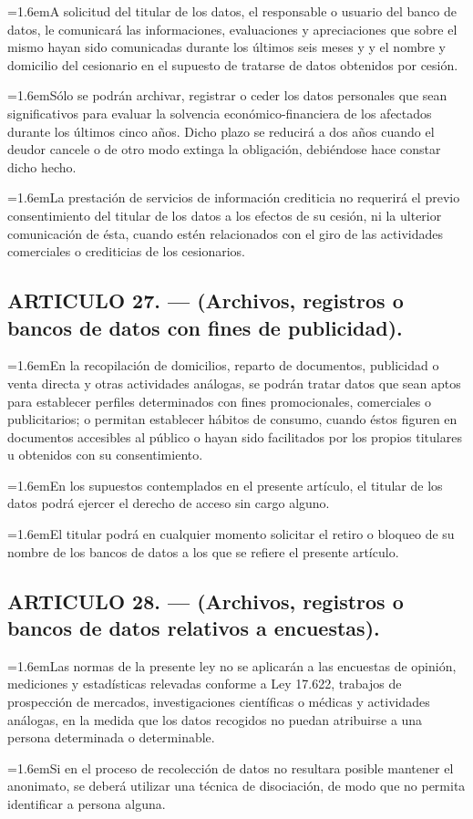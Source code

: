 \documentclass[10pt,a4paper]{article}
\newcommand{\articulo}[1]{\subsection{#1}}
\newcommand{\inciso}[2]{\par{\hangindent=1.6em\hangafter=1\makebox[1.6em][l]{#1}#2\par}}
\begin{document}
\inciso{3.}{A solicitud del titular de los datos, el responsable o usuario del banco de datos, le comunicará las informaciones, evaluaciones y apreciaciones que sobre el mismo hayan sido comunicadas durante los últimos seis meses y y el nombre y domicilio del cesionario en el supuesto de tratarse de datos obtenidos por cesión.}

\inciso{4.}{Sólo se podrán archivar, registrar o ceder los datos personales que sean significativos para evaluar la solvencia económico-financiera de los afectados durante los últimos cinco años. Dicho plazo se reducirá a dos años cuando el deudor cancele o de otro modo extinga la obligación, debiéndose hace constar dicho hecho.}

\inciso{5.}{La prestación de servicios de información crediticia no requerirá el previo consentimiento del titular de los datos a los efectos de su cesión, ni la ulterior comunicación de ésta, cuando estén relacionados con el giro de las actividades comerciales o crediticias de los cesionarios.}

\articulo{ARTICULO 27. — (Archivos, registros o bancos de datos con fines de publicidad).}
\inciso{1.}{En la recopilación de domicilios, reparto de documentos, publicidad o venta directa y otras actividades análogas, se podrán tratar datos que sean aptos para establecer perfiles determinados con fines promocionales, comerciales o publicitarios; o permitan establecer hábitos de consumo, cuando éstos figuren en documentos accesibles al público o hayan sido facilitados por los propios titulares u obtenidos con su consentimiento.}

\inciso{2.}{En los supuestos contemplados en el presente artículo, el titular de los datos podrá ejercer el derecho de acceso sin cargo alguno.}

\inciso{3.}{El titular podrá en cualquier momento solicitar el retiro o bloqueo de su nombre de los bancos de datos a los que se refiere el presente artículo.}

\articulo{ARTICULO 28. — (Archivos, registros o bancos de datos relativos a encuestas).}
\inciso{1.}{Las normas de la presente ley no se aplicarán a las encuestas de opinión, mediciones y estadísticas relevadas conforme a Ley 17.622, trabajos de prospección de mercados, investigaciones científicas o médicas y actividades análogas, en la medida que los datos recogidos no puedan atribuirse a una persona determinada o determinable.}

\inciso{2.}{Si en el proceso de recolección de datos no resultara posible mantener el anonimato, se deberá utilizar una técnica de disociación, de modo que no permita identificar a persona alguna.}
\end{document}
